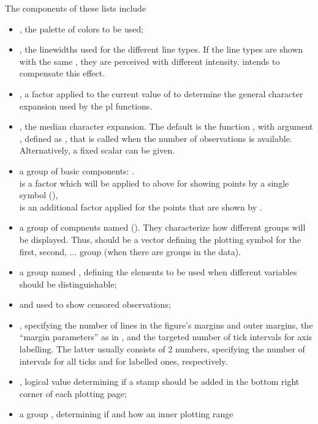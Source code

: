 \documentclass[11pt]{article}
\begin{document}
The components of these lists include
\begin{itemize}
\item 
  , the palette of colors to be used;
\item
  , the linewidths used for the different line types.
  If the line types are shown with the same , they are perceived
  with different intensity.  intends to compensate this effect.
\item
  , a factor applied to the current value of  to
  determine the general character expansion used by the pl functions.
\item
  , the median character expansion.
  The default is the function , with argument , defined as
  , that is called when the number  of
  observations is available. Alternatively, a fixed scalar can be given.
\item
  a group of basic components:
  .\\
   is a factor which will be applied to  above for
  showing points by a single symbol (),\\
   is an additional factor applied for the points that
  are shown by .
\item
  a group of compnents named  ().
  They characterize how different groups will be displayed.
  Thus,  should be a vector defining the plotting symbol
  for the first, second, ... group (when there are groups in the data).
\item
  a group named , 
  defining the elements to be used when different variables should be
  distinguishable;
\item
   and  used to show censored observations;
\item
  , specifying the number of lines in the
  figure's margins and outer margins, the ``margin parameters'' as in
  , and the targeted number of tick intervals for axis labelling.
  The latter usually consists of 2 numbers, specifying the number of
  intervals for all ticks and for labelled ones, respectively. 
\item
  , logical value determining if a stamp should be added in the
  bottom right corner of each plotting page;
\item
  a group , determining if and how an inner plotting range

\end{itemize}
\end{document}
